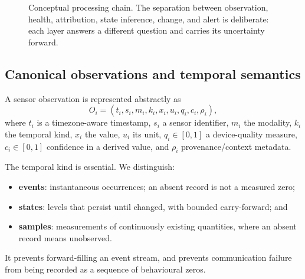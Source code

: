 \documentclass[11pt]{article}
\begin{document}
\begin{figure}[t]
\centering
{}
\caption{Conceptual processing chain. The separation between observation, health, attribution, state inference, change, and alert is deliberate: each layer answers a different question and carries its uncertainty forward.}
\label{fig:architecture}
\end{figure}

\subsection{Canonical observations and temporal semantics}

A sensor observation is represented abstractly as
\begin{equation}
O_i = (t_i,s_i,m_i,k_i,x_i,u_i,q_i,c_i,\rho_i),
\end{equation}
where $t_i$ is a timezone-aware timestamp, $s_i$ a sensor identifier, $m_i$ the modality, $k_i$ the temporal kind, $x_i$ the value, $u_i$ its unit, $q_i\in[0,1]$ a device-quality measure, $c_i\in[0,1]$ confidence in a derived value, and $\rho_i$ provenance/context metadata.

The temporal kind is essential. We distinguish:
\begin{itemize}
    \item \textbf{events}: instantaneous occurrences; an absent record is not a measured zero;
    \item \textbf{states}: levels that persist until changed, with bounded carry-forward; and
    \item \textbf{samples}: measurements of continuously existing quantities, where an absent record means unobserved.
\end{itemize}
It prevents forward-filling an event stream, and prevents communication failure from being recorded as a sequence of behavioural zeros.
\end{document}
